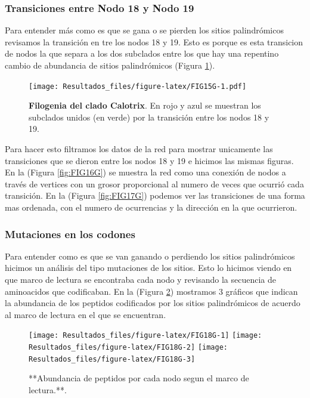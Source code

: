\documentclass[
]{book}
\begin{document}
\hypertarget{transiciones-entre-nodo-18-y-nodo-19}{%
\subsubsection{Transiciones entre Nodo 18 y Nodo 19}\label{transiciones-entre-nodo-18-y-nodo-19}}

Para entender más como es que se gana o se pierden los sitios palindrómicos revisamos la transición en tre los nodos 18 y 19. Esto es porque es esta transicion de nodos la que separa a los dos subclados entre los que hay una repentino cambio de abundancia de sitios palindrómicos (Figura \ref{fig:FIG15G}).

\begin{figure}
\centering
\texttt{[image: Resultados\_files/figure-latex/FIG15G-1.pdf]}
\caption{\label{fig:FIG15G}\textbf{Filogenia del clado Calotrix}. En rojo y azul se muestran los subclados unidos (en verde) por la transición entre los nodos 18 y 19.}
\end{figure}

Para hacer esto filtramos los datos de la red para mostrar unicamente las transiciones que se dieron entre los nodos 18 y 19 e hicimos las mismas figuras.
En la (Figura \ref{fig:FIG16G}) se muestra la red como una conexión de nodos a través de vertices con un grosor proporcional al numero de veces que ocurrió cada transición. En la (Figura \ref{fig:FIG17G}) podemos ver las transiciones de una forma mas ordenada, con el numero de ocurrencias y la dirección en la que ocurrieron.

\hypertarget{mutaciones-en-los-codones-3}{%
\subsubsection{Mutaciones en los codones}\label{mutaciones-en-los-codones-3}}

Para entender como es que se van ganando o perdiendo los sitios palindrómicos hicimos un análisis del tipo mutaciones de los sitios. Esto lo hicimos viendo en que marco de lectura se encontraba cada nodo y revisando la secuencia de aminoacidos que codificaban. En la (Figura \ref{fig:FIG18G}) mostramos 3 gráficos que indican la abundancia de los peptidos codificados por los sitios palindrómicos de acuerdo al marco de lectura en el que se encuentran.

\begin{figure}

{\centering \texttt{[image: Resultados\_files/figure-latex/FIG18G-1]} \texttt{[image: Resultados\_files/figure-latex/FIG18G-2]} \texttt{[image: Resultados\_files/figure-latex/FIG18G-3]} 

}

\caption{**Abundancia de peptidos por cada nodo segun el marco de lectura.**.}\label{fig:FIG18G}
\end{figure}
\end{document}
